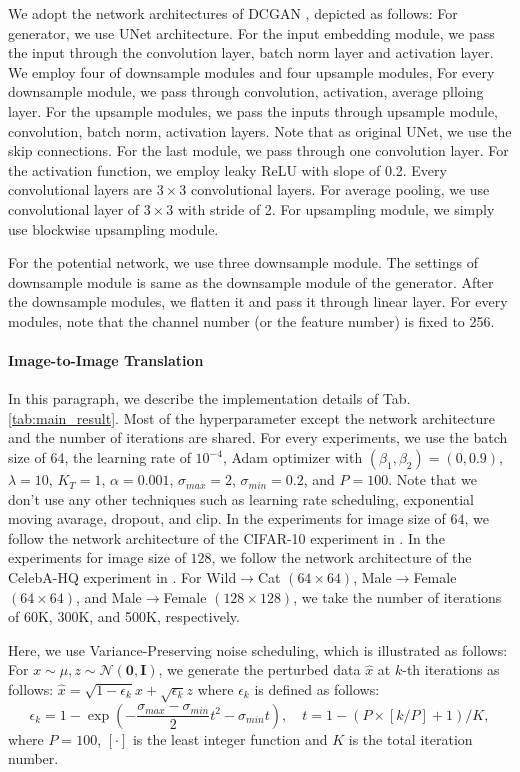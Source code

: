 We adopt the network architectures of DCGAN \cite{dcgan}, depicted as follows: 
For generator, we use UNet architecture. For the input embedding module, we pass the input through the convolution layer, batch norm layer and activation layer. We employ four of downsample modules and four upsample modules, For every downsample module, we pass through convolution, activation, average plloing layer. For the upsample modules, we pass the inputs through upsample module, convolution, batch norm, activation layers. Note that as original UNet, we use the skip connections. For the last module, we pass through one convolution layer. For the activation function, we employ leaky ReLU with slope of 0.2. Every convolutional layers are $3\times 3$ convolutional layers. For average pooling, we use convolutional layer of $3\times 3$ with stride of 2. For upsampling module, we simply use blockwise upsampling module.

For the potential network, we use three downsample module. The settings of downsample module is same as the downsample module of the generator.
After the downsample modules, we flatten it and pass it through linear layer.
For every modules, note that the channel number (or the feature number) is fixed to 256.

\paragraph{Image-to-Image Translation}
In this paragraph, we describe the implementation details of Tab. \ref{tab:main_result}.
Most of the hyperparameter except the network architecture and the number of iterations are shared.
For every experiments, we use the batch size of 64, the learning rate of $10^{-4}$, Adam optimizer with $(\beta_1, \beta_2) = (0, 0.9)$, $\lambda=10$, $K_T=1$, $\alpha=0.001$, $\sigma_{max} = 2$, $\sigma_{min} = 0.2$, and $P=100$.
Note that we don't use any other techniques such as learning rate scheduling, exponential moving avarage, dropout, and clip.
In the experiments for image size of $64$, we follow the network architecture of the CIFAR-10 experiment in \cite{uotm, uotmsd}.
In the experiments for image size of $128$, we follow the network architecture of the CelebA-HQ experiment in \cite{uotm}.
For Wild$\rightarrow$Cat $(64\times 64)$, Male$\rightarrow$Female $(64\times 64)$, and Male$\rightarrow$Female $(128\times 128)$,
we take the number of iterations of 60K, 300K, and 500K, respectively.

Here, we use Variance-Preserving noise scheduling, which is illustrated as follows:
For $x\sim \mu, z\sim \mathcal{N}(\mathbf{0}, \mathbf{I})$, we generate the perturbed data $\hat{x}$ at $k$-th iterations as follows: $\hat{x} = \sqrt{1 - \epsilon_k} x + \sqrt{\epsilon_k} z$ where $\epsilon_k$ is defined as follows:
\begin{equation}
    \epsilon_k = 1 - \exp\left(-\frac{\sigma_{max} - \sigma_{min}}{2} t^2  - {\sigma_{min}} t\right), \quad t = 1 - (P \times [k/P]+1) / K,
\end{equation}
where $P=100$, $[\cdot]$ is the least integer function and $K$ is the total iteration number.

